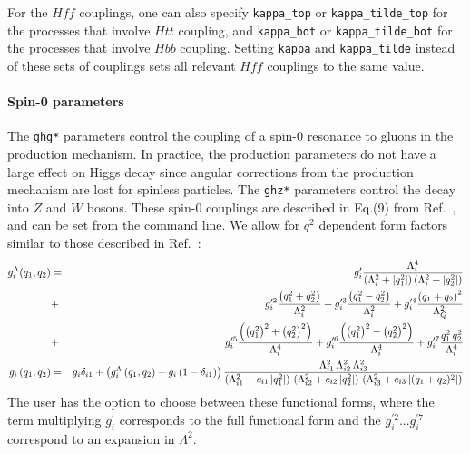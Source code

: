 \documentclass[aps,superscriptaddress,nofootinbib]{revtex4}
\begin{document}
\begin{itemize}
For the $Hff$ couplings, one can also specify \verb|kappa_top| or \verb|kappa_tilde_top| for the processes that involve $Htt$ coupling, and \verb|kappa_bot| or \verb|kappa_tilde_bot| for the processes that involve $Hbb$ coupling. Setting \verb|kappa| and \verb|kappa_tilde| instead of these sets of couplings sets all relevant $Hff$ couplings to the same value.
\end{itemize}

\paragraph{Spin-0 parameters}
\label{spin0}
The \verb|ghg*| parameters control the coupling of a spin-0 resonance to gluons in the production mechanism.
In practice, the production parameters do not have a large effect on Higgs decay since angular corrections from the production mechanism are lost for spinless particles.
The \verb|ghz*| parameters control the decay into $Z$ and $W$ bosons.
These spin-0 couplings are described in Eq.(9) from Ref.~\cite{Bolognesi:2012}, and can be set from the command line.
We allow for $q^2$ dependent form factors similar to those described in Ref.~\cite{Anderson:2013}:
\begin{eqnarray*}
	g^\Lambda_i(q_1,q_2) &=&
	g_i' \frac{\Lambda_i^4}{\left(\Lambda_i^2 + |q_1^2|\right)\left(\Lambda_i^2 + |q_2^2|\right)} \\
	&+& g_i^{\prime 2}  \frac{\left(q_1^2+q_2^2\right)}{\Lambda_i^2}
	+ g_i^{\prime 3}  \frac{\left(q_1^2-q_2^2\right)}{\Lambda_i^2}
	+ g_i^{\prime 4}  \frac{\left(q_1+q_2\right)^2}{\Lambda_Q^2} \\
	&+& g_i^{\prime 5}  \frac{\left(\left(q_1^2\right)^2+\left(q_2^2\right)^2\right)}{\Lambda_i^4}
	+ g_i^{\prime 6}  \frac{\left(\left(q_1^2\right)^2-\left(q_2^2\right)^2\right)}{\Lambda_i^4}
	+ g_i^{\prime 7}  \frac{q_1^2 \, q_2^2}{\Lambda_i^4} \\
	g_i\left(q_1,q_2\right) &=& g_i \delta_{i1} + \left(g^\Lambda_i \left(q_1,q_2\right) + g_i \left(1- \delta_{i1}\right)\right)
	\frac{\Lambda^2_{i1}\,\Lambda^2_{i2}\,\Lambda^2_{i3}}
	{\left(\Lambda^2_{i1}+c_{i1}\left|q_1^2\right|\right)\,\left(\Lambda^2_{i2}+c_{i2}\left|q_2^2\right|\right)\,\left(\Lambda^2_{i3}+c_{i3}\left|(q_1+q_2)^2\right|\right)}
	\noindent
\end{eqnarray*}
The user has the option to choose between these functional forms,
where the term multiplying $g_i^\prime$ corresponds to the full functional form and the $g_i^{\prime 2}... g_i^{\prime 7}$ correspond to an expansion in $\Lambda^2$.
\end{document}
